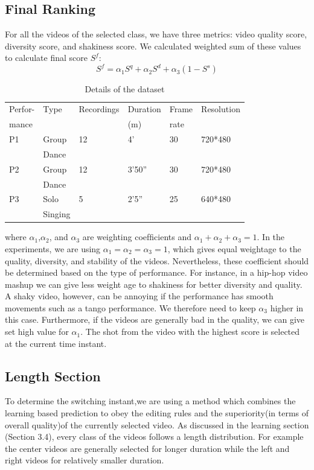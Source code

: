 \documentclass{sig-alternate}
\begin{document}
\subsection{Final Ranking}
For all the videos of the selected class, we have three metrics: video quality score, diversity score, and shakiness score. We calculated weighted sum of these values to calculate ﬁnal score \(S^f\):
\begin{equation}
 S^f = \alpha_1S^q + \alpha_2S^d + \alpha_3(1 - S^s)
\end{equation}

\begin{table}
\centering
\caption{ Details of the dataset }
\begin{tabular}{p{1cm}|p{0.9cm}|p{1.4cm}|p{1.3cm}|p{0.8cm}|p{1.3cm}} \hline
Perfor-&Type &Recordings &Duration&Frame&Resolution \\ 
mance & & & (m)&rate& \\ \hline
P1 &Group&12 &4' &30 &720*480\\
&Dance&&&&\\ \hline
P2 &Group&12 &3'50'' &30& 720*480\\
&Dance&&&&\\ \hline
P3& Solo&5 &2'5'' &25 &640*480\\
&Singing&&&&\\ \hline

\end{tabular}
\end{table}

where \(\alpha_1\),\(\alpha_2\), and \(\alpha_3\) are weighting coefﬁcients and \(\alpha_1 + \alpha_2 + \alpha_3 =1\). In the experiments, we are using \(\alpha_1 = \alpha_2 = \alpha_3 =1\),
which gives equal weightage to the quality, diversity, and stability of the videos. Nevertheless, these coefficient should be determined based on the type of performance. For instance, in a hip-hop video mashup we can give less weight age to shakiness for better diversity and quality. A shaky video, however, can be annoying if the performance has smooth movements such as a tango performance. We therefore need to keep \(\alpha_3\) higher in this case. Furthermore, if the videos are generally bad in the quality, we can give set high value for \(\alpha_1\). The shot from the video with the highest score is selected at the current time instant. 
\subsection{Length Section}
To determine the switching instant,we are using a method which combines the learning based prediction to obey the editing rules and the superiority(in terms of overall quality)of the currently selected video. As discussed in the learning section (Section 3.4), every class of the videos follows a length distribution. For example the center videos are generally selected for longer duration while the left and right videos for relatively smaller duration. 
\end{document}
